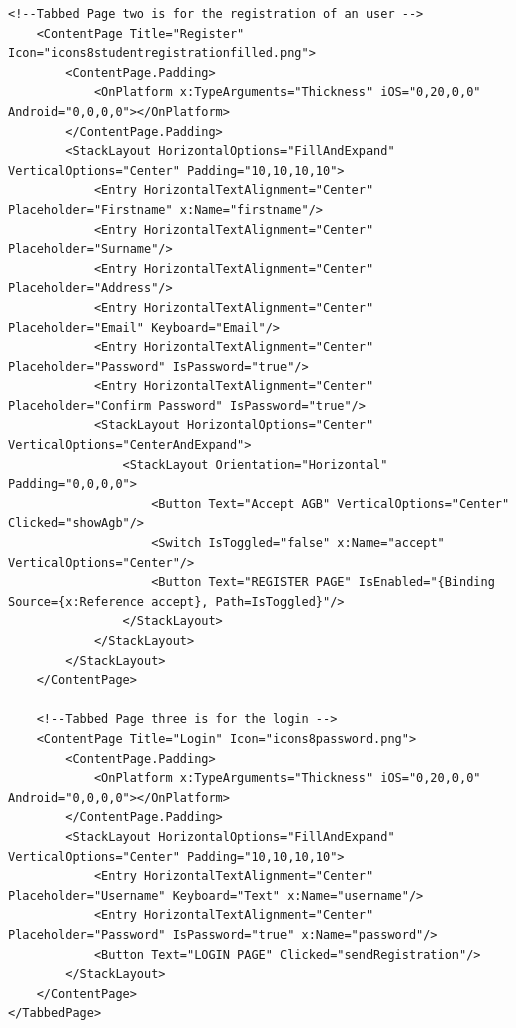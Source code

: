 \begin{lstlisting}[caption={MCKB - Design XAML Code},label={lst:mckbdesigncode},captionpos=b,style=XML-Own]
    <!--Tabbed Page two is for the registration of an user -->
    <ContentPage Title="Register" Icon="icons8studentregistrationfilled.png">
        <ContentPage.Padding>
            <OnPlatform x:TypeArguments="Thickness" iOS="0,20,0,0" Android="0,0,0,0"></OnPlatform>
        </ContentPage.Padding>
        <StackLayout HorizontalOptions="FillAndExpand" VerticalOptions="Center" Padding="10,10,10,10">
            <Entry HorizontalTextAlignment="Center" Placeholder="Firstname" x:Name="firstname"/>
            <Entry HorizontalTextAlignment="Center" Placeholder="Surname"/>
            <Entry HorizontalTextAlignment="Center" Placeholder="Address"/>
            <Entry HorizontalTextAlignment="Center" Placeholder="Email" Keyboard="Email"/>
            <Entry HorizontalTextAlignment="Center" Placeholder="Password" IsPassword="true"/>
            <Entry HorizontalTextAlignment="Center" Placeholder="Confirm Password" IsPassword="true"/>
            <StackLayout HorizontalOptions="Center" VerticalOptions="CenterAndExpand">
                <StackLayout Orientation="Horizontal" Padding="0,0,0,0">
                    <Button Text="Accept AGB" VerticalOptions="Center" Clicked="showAgb"/>
                    <Switch IsToggled="false" x:Name="accept" VerticalOptions="Center"/>
                    <Button Text="REGISTER PAGE" IsEnabled="{Binding Source={x:Reference accept}, Path=IsToggled}"/>
                </StackLayout>
            </StackLayout>
        </StackLayout>
    </ContentPage>

    <!--Tabbed Page three is for the login -->
    <ContentPage Title="Login" Icon="icons8password.png">
        <ContentPage.Padding>
            <OnPlatform x:TypeArguments="Thickness" iOS="0,20,0,0" Android="0,0,0,0"></OnPlatform>
        </ContentPage.Padding>
        <StackLayout HorizontalOptions="FillAndExpand" VerticalOptions="Center" Padding="10,10,10,10">
            <Entry HorizontalTextAlignment="Center" Placeholder="Username" Keyboard="Text" x:Name="username"/>
            <Entry HorizontalTextAlignment="Center" Placeholder="Password" IsPassword="true" x:Name="password"/>
            <Button Text="LOGIN PAGE" Clicked="sendRegistration"/>
        </StackLayout>
    </ContentPage>
</TabbedPage>
	\end{lstlisting}




\clearpage

